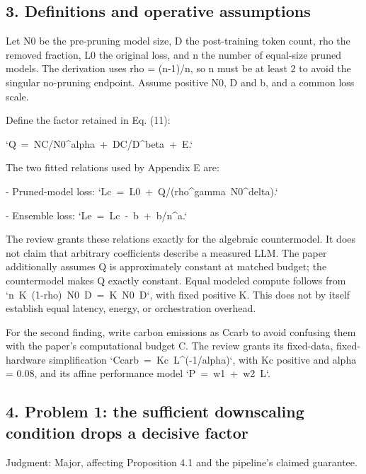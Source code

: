 \documentclass[10pt]{article}
\begin{document}
\subsection*{3. Definitions and operative assumptions}
Let N0 be the pre-pruning model size, D the post-training token count, rho the removed fraction, L0 the original loss, and n the number of equal-size pruned models. The derivation uses rho = (n-1)/n, so n must be at least 2 to avoid the singular no-pruning endpoint. Assume positive N0, D and b, and a common loss scale.\par
Define the factor retained in Eq. (11):\par
`Q = NC/N0\textasciicircum{}alpha + DC/D\textasciicircum{}beta + E.`\par
The two fitted relations used by Appendix E are:\par
- Pruned-model loss: `Lc = L0 + Q/(rho\textasciicircum{}gamma N0\textasciicircum{}delta).`\par
- Ensemble loss: `Le = Lc - b + b/n\textasciicircum{}a.`\par
The review grants these relations exactly for the algebraic countermodel. It does not claim that arbitrary coefficients describe a measured LLM. The paper additionally assumes Q is approximately constant at matched budget; the countermodel makes Q exactly constant. Equal modeled compute follows from `n K (1-rho) N0 D = K N0 D`, with fixed positive K. This does not by itself establish equal latency, energy, or orchestration overhead.\par
For the second finding, write carbon emissions as Ccarb to avoid confusing them with the paper’s computational budget C. The review grants its fixed-data, fixed-hardware simplification `Ccarb = Kc L\textasciicircum{}(-1/alpha)`, with Kc positive and alpha = 0.08, and its affine performance model `P = w1 + w2 L`.\par
\subsection*{4. Problem 1: the sufficient downscaling condition drops a decisive factor}
Judgment: Major, affecting Proposition 4.1 and the pipeline’s claimed guarantee.\par
\end{document}
